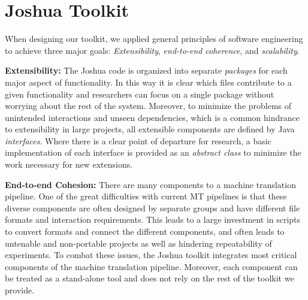 \documentclass[11pt]{article}
\begin{document}


\section{Joshua Toolkit}
When designing our toolkit, we applied general principles of software engineering to achieve three major goals: \emph{Extensibility}, \emph{end-to-end coherence}, and \emph{scalability}.

\textbf{Extensibility:} The Joshua code is organized into separate \emph{packages} for each major aspect of functionality. In this way it is clear which files contribute to a given functionality and researchers can focus on a single package without worrying about the rest of the system. Moreover, to minimize the problems of unintended interactions and unseen dependencies, which is a common hindrance to extensibility in large projects, all extensible components are defined by Java \emph{interfaces}. Where there is a clear point of departure for research, a basic implementation of each interface is provided as an \emph{abstract class} to minimize the work necessary for new extensions.

\textbf{End-to-end Cohesion:} There are many components to a machine translation pipeline. One of the great difficulties with current MT pipelines is that these diverse components are often designed by separate groups and have different file formats and interaction requirements. This leads to a large investment in scripts to convert formats and connect the different components, and often leads to untenable and non-portable projects as well as hindering repeatability of experiments.
To combat these issues, the Joshua toolkit integrates most critical components of the machine translation pipeline. Moreover, each component can be treated as a stand-alone tool and does not rely on the rest of the toolkit we provide.
\end{document}
